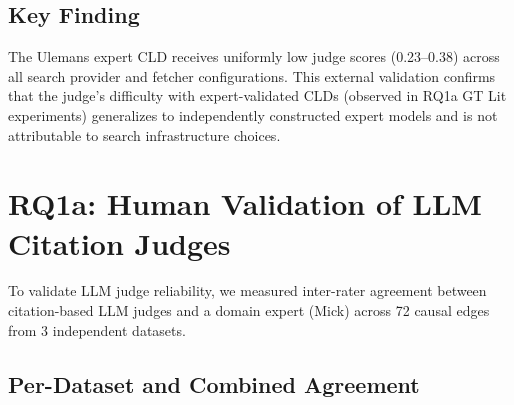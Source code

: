 \documentclass{article}
\begin{document}
\subsection{Key Finding}

The Ulemans expert CLD receives uniformly low judge scores (0.23--0.38) across all search provider and fetcher configurations. This external validation confirms that the judge's difficulty with expert-validated CLDs (observed in RQ1a GT Lit experiments) generalizes to independently constructed expert models and is not attributable to search infrastructure choices.

\section{RQ1a: Human Validation of LLM Citation Judges}

To validate LLM judge reliability, we measured inter-rater agreement between citation-based LLM judges and a domain expert (Mick) across 72 causal edges from 3 independent datasets.

\subsection{Per-Dataset and Combined Agreement}
\end{document}
